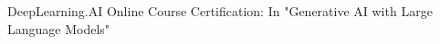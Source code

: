 \begin{zitemize}
\item DeepLearning.AI Online Course Certification: In "Generative AI with Large Language Models"
\end{zitemize}
